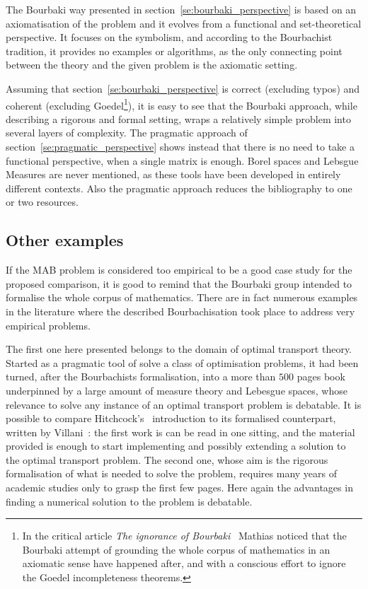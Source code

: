 \documentclass[]{scrartcl}
\theoremstyle{definition}
\begin{document}
The Bourbaki way presented in section~\ref{se:bourbaki_perspective} is based on an axiomatisation of the problem and it evolves from a functional and set-theoretical perspective. It focuses on the symbolism, and according to the Bourbachist tradition, it provides no examples or algorithms, as the only connecting point between the theory and the given problem is the axiomatic setting.

Assuming that section~\ref{se:bourbaki_perspective} is correct (excluding typos) and coherent (excluding Goedel\footnote{
    In the critical article \emph{The ignorance of Bourbaki}~\cite{mathias1992ignorance} Mathias noticed that the Bourbaki attempt of grounding the whole corpus of mathematics in an axiomatic sense have happened after, and with a conscious effort to ignore the Goedel incompleteness theorems.
}), it is easy to see that the Bourbaki approach, while describing a rigorous and formal setting, wraps a relatively simple problem into several layers of complexity.
The pragmatic approach of section~\ref{se:pragmatic_perspective} shows instead that there is no need to take a functional perspective, when a single matrix is enough. Borel spaces and Lebsgue Measures are never mentioned, as these tools have been developed in entirely different contexts. Also the pragmatic approach reduces the bibliography to one or two resources.

\subsection*{Other examples}

If the MAB problem is considered too empirical to be a good case study for the proposed comparison, it is good to remind that the Bourbaki group intended to formalise the whole corpus of mathematics. There are in fact numerous examples in the literature where the described Bourbachisation took place to address very empirical problems. 

The first one here presented belongs to the domain of optimal transport theory. Started as a pragmatic tool of solve a class of optimisation problems, it had been turned, after the Bourbachists formalisation, into a more than $500$ pages book underpinned by a large amount of measure theory and Lebesgue spaces, whose relevance to solve any instance of an optimal transport problem is debatable. It is possible to compare Hitchcock's~\cite{hitchcock1941distribution} introduction to its formalised counterpart, written by Villani~\cite{villani2003topics}: the first work is can be read in one sitting, and the material provided is enough to start implementing and possibly extending a solution to the optimal transport problem. The second one, whose aim is the rigorous formalisation of what is needed to solve the problem, requires many years of academic studies only to grasp the first few pages. Here again the advantages in finding a numerical solution to the problem is debatable.
\end{document}
